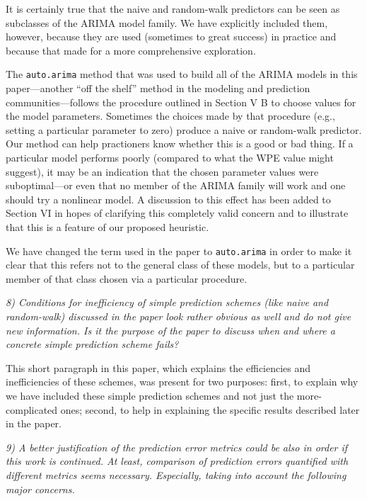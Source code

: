 \documentclass[12pt]{article}
\begin{document}
It is certainly true that the naive and random-walk predictors can be
seen as subclasses of the ARIMA model family.  We have explicitly
included them, however, because they are used (sometimes to great
success) in practice and because that made for a more comprehensive exploration.

The {\tt auto.arima} method that was used to build all of the ARIMA
models in this paper---another ``off the shelf'' method in the
modeling and prediction communities---follows the procedure outlined
in Section V B to choose values for the model parameters.
Sometimes the choices made by that procedure (e.g., setting a
particular parameter to zero) produce a naive or random-walk
predictor.  Our method can help practioners know whether this is a
good or bad thing.  If a particular model performs poorly (compared to
what the WPE value might suggest), it may be an indication that the
chosen parameter values were suboptimal---or even that no member of
the ARIMA family will work and one should try a nonlinear model. A discussion to this effect has been added to Section
VI in hopes of clarifying this completely valid concern and to illustrate that this is a feature of our proposed heuristic.


We have changed the term used in the paper to {\tt auto.arima} in
order to make it clear that this refers not to the general class of
these models, but to a particular member of that class chosen via a
particular procedure.

\smallskip

\emph{8) Conditions for inefficiency of simple prediction schemes
  (like naive and random-walk) discussed in the paper look rather
  obvious as well and do not give new information. Is it the purpose
  of the paper to discuss when and where a concrete simple prediction
  scheme fails?}

This short paragraph in this paper, which explains the efficiencies
and inefficiencies of these schemes, was present for two purposes:
first, to explain why we have included these simple prediction schemes
and not just the more-complicated ones; second, to help in explaining
the specific results described later in the paper.

\smallskip

\emph{9) A better justification of the prediction error metrics could
  be also in order if this work is continued. At least, comparison of
  prediction errors quantified with different metrics seems
  necessary. Especially, taking into account the following major
  concerns.}
\end{document}
